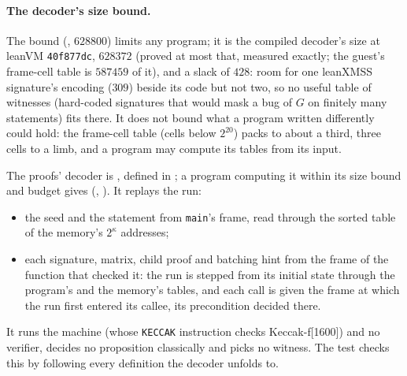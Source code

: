 \documentclass[11pt]{article}
\begin{document}
\paragraph{The decoder's size bound.} The bound (, $628800$)
limits any program; it is the compiled decoder's size at leanVM \texttt{40f877dc}, $628372$ (proved
at most that, measured exactly; the guest's frame-cell table is $587459$ of it), and a slack of
$428$: room for one leanXMSS signature's encoding ($309$) beside its code but not two, so no useful
table of witnesses (hard-coded signatures that would mask a bug of $G$ on finitely many statements)
fits there. It does not bound what a program written differently could hold: the frame-cell table
(cells below $2^{20}$) packs to about a third, three cells to a limb, and a program may compute its
tables from its input.

The proofs' decoder is , defined in ; a program
computing it within its size bound and budget gives 
(, ). It replays the run:
\begin{itemize}
\item the seed and the statement from \texttt{main}'s frame, read through the sorted table of the
memory's $2^\kappa$ addresses;
\item each signature, matrix, child proof and batching hint from the frame of the function that
checked it: the run is stepped from its initial state through the program's and the memory's
tables, and each call is given the frame at which the run first entered its callee, its
precondition decided there.
\end{itemize}
It runs the machine (whose \texttt{KECCAK} instruction checks Keccak-f[1600]) and no verifier,
decides no proposition classically and picks no witness. The test
 checks this by following every definition the decoder
unfolds to.
\end{document}
